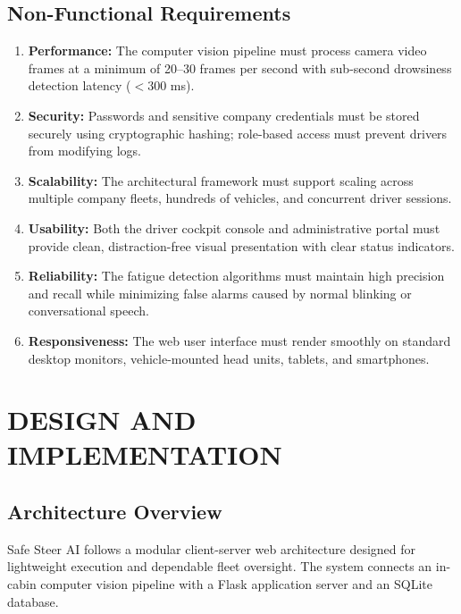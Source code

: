 \documentclass[a4paper,12pt]{report}
\begin{document}
\section{Non-Functional Requirements}
\begin{enumerate}
    \item \textbf{Performance:} The computer vision pipeline must process camera video frames at a minimum of 20--30 frames per second with sub-second drowsiness detection latency ($< 300$ ms).
    \item \textbf{Security:} Passwords and sensitive company credentials must be stored securely using cryptographic hashing; role-based access must prevent drivers from modifying logs.
    \item \textbf{Scalability:} The architectural framework must support scaling across multiple company fleets, hundreds of vehicles, and concurrent driver sessions.
    \item \textbf{Usability:} Both the driver cockpit console and administrative portal must provide clean, distraction-free visual presentation with clear status indicators.
    \item \textbf{Reliability:} The fatigue detection algorithms must maintain high precision and recall while minimizing false alarms caused by normal blinking or conversational speech.
    \item \textbf{Responsiveness:} The web user interface must render smoothly on standard desktop monitors, vehicle-mounted head units, tablets, and smartphones.
\end{enumerate}

\chapter{DESIGN AND IMPLEMENTATION}

\section{Architecture Overview}
Safe Steer AI follows a modular client-server web architecture designed for lightweight execution and dependable fleet oversight. The system connects an in-cabin computer vision pipeline with a Flask application server and an SQLite database. 
\end{document}
